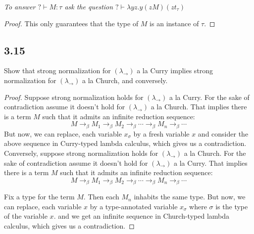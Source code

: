 \documentclass[12pt]{article}
\begin{document}
\textsl{To answer $? \vdash M : \tau$ ask the question $? \vdash \lambda yz.y(zM)(zt_\tau)$} \\

\begin{proof}
This only guarantees that the type of $M$ is an instance of $\tau$.
\end{proof}

\subsection*{3.15}
Show that strong normalization for $(\lambda_\rightarrow)$ a la Curry implies strong normalization for $(\lambda_\rightarrow)$ a la Church, and conversely. 

\begin{proof}
Suppose strong normalization holds for $(\lambda_{\rightarrow})$ a la Curry. For the sake of contradiction assume it doesn't hold for $(\lambda_{\rightarrow})$ a la Church. That implies there is a term $M$ such that it admits an infinite reduction sequence:
$$M \rightarrow_\beta M_1 \rightarrow_\beta M_2 \rightarrow_\beta \cdots \rightarrow_\beta M_n \rightarrow_\beta \cdots$$
But now, we can replace, each variable $x_\sigma$ by a fresh variable $x$ and consider the above sequence in Curry-typed lambda calculus, which gives us a contradiction. \\

Conversely, suppose strong normalization holds for $(\lambda_{\rightarrow})$ a la Church. For the sake of contradiction assume it doesn't hold for $(\lambda_{\rightarrow})$ a la Curry. That implies there is a term $M$ such that it admits an infinite reduction sequence:
$$M \rightarrow_\beta M_1 \rightarrow_\beta M_2 \rightarrow_\beta \cdots \rightarrow_\beta M_n \rightarrow_\beta \cdots$$

Fix a type for the term $M$. Then each $M_n$ inhabits the same type. But now, we can replace, each variable $x$ by a type-annotated variable $x_\sigma$ where $\sigma$ is the type of the variable $x$. and we get an infinite sequence in Church-typed lambda calculus, which gives us a contradiction.
\end{proof}

\vspace{1in} %
\end{document}

